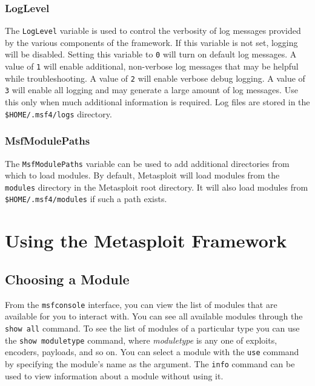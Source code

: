 \documentclass{report}
\begin{document}
	\subsection{LogLevel}

\par
The \texttt{LogLevel} variable is used to control the verbosity of log messages
provided by the various components of the framework. If this variable is not
set, logging will be disabled. Setting this variable to \texttt{0} will turn on
default log messages. A value of \texttt{1} will enable additional, non-verbose
log messages that may be helpful while troubleshooting. A value of \texttt{2}
will enable verbose debug logging. A value of \texttt{3} will enable all logging
and may generate a large amount of log messages. Use this only when much
additional information is required. Log files are stored in the
\texttt{\$HOME/.msf4/logs} directory.

	\subsection{MsfModulePaths}

\par
The \texttt{MsfModulePaths} variable can be used to add additional directories
from which to load modules. By default, Metasploit will load modules from the
\texttt{modules} directory in the Metasploit root directory. It will also load
modules from \texttt{\$HOME/.msf4/modules} if such a path exists.

\pagebreak

\chapter{Using the Metasploit Framework}

	\section{Choosing a Module}

\par
From the \texttt{msfconsole} interface, you can view the list of modules that
are available for you to interact with. You can see all available modules
through the \texttt{show all} command. To see the list of modules of a
particular type you can use the \texttt{show moduletype} command, where
\textit{moduletype} is any one of exploits, encoders, payloads, and so on. You
can select a module with the \texttt{use} command by specifying the module's
name as the argument. The \texttt{info} command can be used to view information
about a module without using it.
\end{document}
